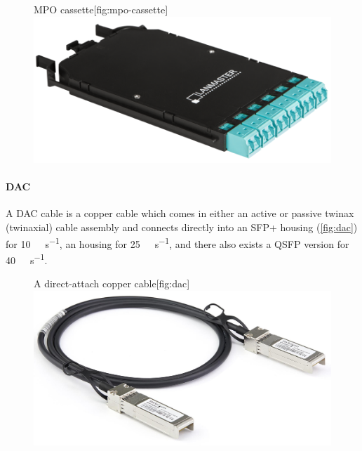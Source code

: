 \begin{figure}
\begin{sidecaption}{\acs{MPO} cassette}[fig:mpo-cassette]
   \centering
   \includegraphics[width=\textwidth]{images/physical/mpo-cassette.png}
\end{sidecaption}
\end{figure}



\paragraph{\acl{DAC}}
A \acf{DAC} cable is a copper cable which comes in either an active or passive twinax (twinaxial) cable assembly and connects directly into an
\acs{SFP+} housing (\vref{fig:dac}) for \SI{10}{\giga\bit\per\second},
an  housing for \SI{25}{\giga\bit\per\second},
and there also exists a \acs{QSFP} version for \SI{40}{\giga\bit\per\second}.

\begin{figure}
\begin{sidecaption}{A direct-attach copper cable}[fig:dac]
\centering
\includegraphics[width=\textwidth]{images/physical/dac-cable.jpeg}
\end{sidecaption}
\end{figure}

